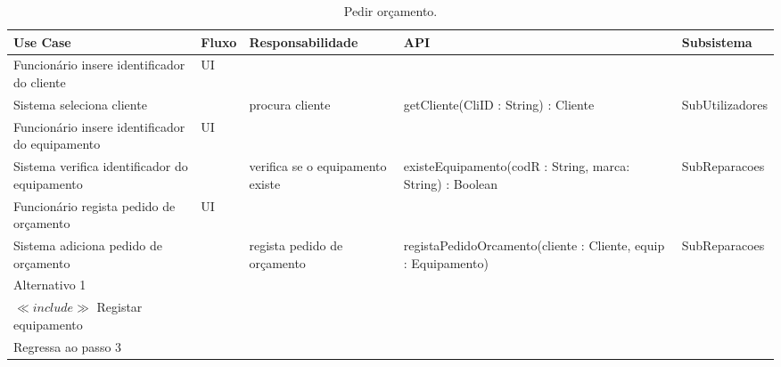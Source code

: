 \documentclass[../relatorio.tex]{subfiles}
\begin{document}
\begin{landscape}
    \begin{table}[!h]
        \centering
        \begin{tabular}{|p{5cm}|p{1cm}|p{4cm}|p{6cm}|p{3cm}|}
            \hline
            \rowcolor{gray!20!white}
            Use Case & Fluxo                                            & Responsabilidade & API & Subsistema \\
            \hline
            \rowcolor{yellow}
            Funcionário insere identificador do cliente
                     & UI
                     & 
                     & 
                     & 
            \\
            \hline
            Sistema seleciona cliente
                     & 
                     & procura cliente
                     & getCliente(CliID : String) : Cliente
                     & SubUtilizadores
            \\
            \hline
            \rowcolor{yellow}
            Funcionário insere identificador do equipamento
                     & UI
                     & 
                     & 
                     & 
            \\
            \hline
            Sistema verifica identificador do equipamento
                     & 
                     & verifica se o equipamento existe
                     & existeEquipamento(codR : String, marca: String) : Boolean
                     & SubReparacoes
            \\
            \hline
			\rowcolor{yellow}
			Funcionário regista pedido de orçamento
                     & UI
                     & 
                     & 
                     & 
            \\
            \hline
			Sistema adiciona pedido de orçamento
                     & 
                     & regista pedido de orçamento
                     & registaPedidoOrcamento(cliente : Cliente, equip : Equipamento)
                     & SubReparacoes
            \\
            \hline
            \rowcolor{red!30}
            Alternativo 1  &                                                  &                  &     &            \\
            \hline
            $\ll include \gg$ Registar equipamento
                     & 
                     & 
                     & 
                     & 
            \\
            \hline
			Regressa ao passo 3
                     & 
                     & 
                     & 
                     & 
            \\
            \hline
        \end{tabular}
        \caption{Pedir orçamento.}
    \end{table}
\end{landscape}
\end{document}
